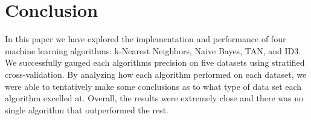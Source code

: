 \documentclass{article}
\begin{document}
\section{Conclusion}
	In this paper we have explored the implementation and performance of four machine learning algorithms: k-Nearest Neighbors, Naive Bayes, TAN, and ID3. We successfully gauged each algorithms precision on five datasets using stratified cross-validation. By analyzing how each algorithm performed on each dataset, we were able to tentatively make some conclusions as to what type of data set each algorithm excelled at. Overall, the results were extremely close and there was no single algorithm that outperformed the rest.
	\pagebreak


	
	
	
\end{document}
